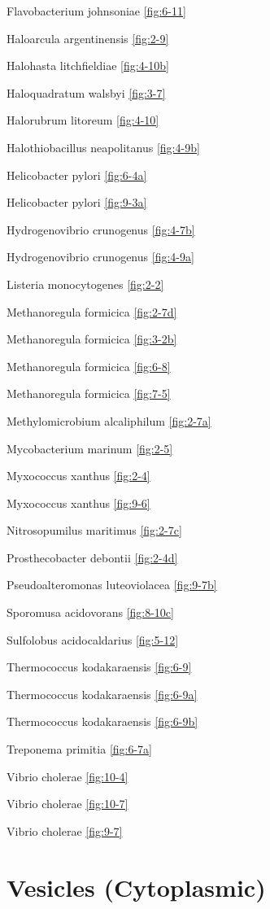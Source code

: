 \documentclass[]{tufte-book}
\begin{document}
Flavobacterium johnsoniae \ref{fig:6-11}

Haloarcula argentinensis \ref{fig:2-9}

Halohasta litchfieldiae \ref{fig:4-10b}

Haloquadratum walsbyi \ref{fig:3-7}

Halorubrum litoreum \ref{fig:4-10}

Halothiobacillus neapolitanus \ref{fig:4-9b}

Helicobacter pylori \ref{fig:6-4a}

Helicobacter pylori \ref{fig:9-3a}

Hydrogenovibrio crunogenus \ref{fig:4-7b}

Hydrogenovibrio crunogenus \ref{fig:4-9a}

Listeria monocytogenes \ref{fig:2-2}

Methanoregula formicica \ref{fig:2-7d}

Methanoregula formicica \ref{fig:3-2b}

Methanoregula formicica \ref{fig:6-8}

Methanoregula formicica \ref{fig:7-5}

Methylomicrobium alcaliphilum \ref{fig:2-7a}

Mycobacterium marinum \ref{fig:2-5}

Myxococcus xanthus \ref{fig:2-4}

Myxococcus xanthus \ref{fig:9-6}

Nitrosopumilus maritimus \ref{fig:2-7c}

Prosthecobacter debontii \ref{fig:2-4d}

Pseudoalteromonas luteoviolacea \ref{fig:9-7b}

Sporomusa acidovorans \ref{fig:8-10c}

Sulfolobus acidocaldarius \ref{fig:5-12}

Thermococcus kodakaraensis \ref{fig:6-9}

Thermococcus kodakaraensis \ref{fig:6-9a}

Thermococcus kodakaraensis \ref{fig:6-9b}

Treponema primitia \ref{fig:6-7a}

Vibrio cholerae \ref{fig:10-4}

Vibrio cholerae \ref{fig:10-7}

Vibrio cholerae \ref{fig:9-7}

\section{\texorpdfstring{\textbf{Vesicles
(Cytoplasmic)}}{Vesicles (Cytoplasmic)}}\label{vesicles-cytoplasmic}
\end{document}
